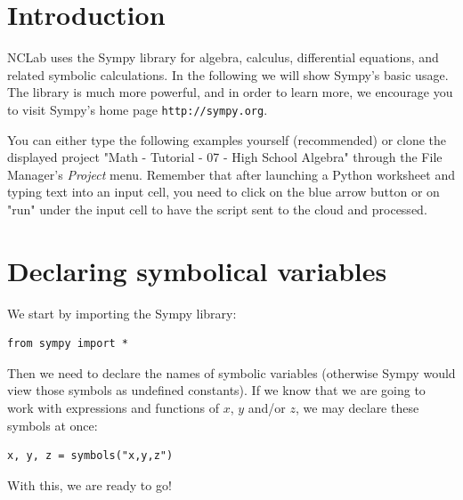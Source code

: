 \documentclass{article}
\begin{document}
\section{Introduction}

NCLab uses the Sympy library for algebra, calculus, differential equations, and related 
symbolic calculations. In the following we will show Sympy's basic usage. The library 
is much more powerful, and in order to learn more, we encourage you to visit Sympy's
home page {\tt http://sympy.org}. 

You can either type the 
following examples yourself (recommended) or clone the displayed project 
"Math - Tutorial - 07 - High School Algebra" through the File Manager's
{\em Project} menu. Remember that after launching a Python worksheet and 
typing text into an input cell, you need to click on the blue arrow button 
or on "run" under the input cell to have the script sent to the cloud and processed.

\section{Declaring symbolical variables}

We start by importing the Sympy library:

\begin{verbatim}
from sympy import *
\end{verbatim}
Then we need to declare the names of symbolic variables (otherwise Sympy would 
view those symbols as undefined constants). If we know that we are going to work 
with expressions and functions of $x$, $y$ and/or $z$, we may declare these symbols 
at once:
\begin{verbatim}
x, y, z = symbols("x,y,z")
\end{verbatim}
With this, we are ready to go!
\end{document}
